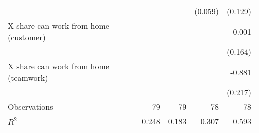 {\begin{tabular}{l*{4}{D{.}{.}{-1}}}
                    &                     &                     &     (0.059)         &     (0.129)         \\
[1em]
   X share can work from home (customer)&                     &                     &                     &       0.001         \\
                    &                     &                     &                     &     (0.164)         \\
[1em]
   X share can work from home (teamwork)&                     &                     &                     &      -0.881\sym{***}\\
                    &                     &                     &                     &     (0.217)         \\
\hline
Observations        &          79         &          79         &          78         &          78         \\
\(R^{2}\)           &       0.248         &       0.183         &       0.307         &       0.593         \\
\hline\hline
\end{tabular}
}
